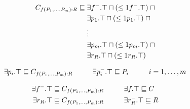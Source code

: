     \begin{equation} \label{e_op_tuple_rev}
      \begin{split}
  	C_{f(P_1, ..., P_m):R} \sqsubseteq \hspace*{1mm}& \exists f^-.\top \sqcap (\leq 1 f^-.\top) \hspace*{1mm} \sqcap \\
  	 \hspace*{1mm}& \exists p_1.\top \sqcap (\leq 1 p_1.\top) \hspace*{1mm} \sqcap \\
  	\hspace*{1mm}& \vdots  \\
  	\hspace*{1mm}& \exists p_m.\top \sqcap (\leq 1 p_m.\top) \hspace*{1mm} \sqcap \\
  	\hspace*{1mm}& \exists r_R.\top \sqcap (\leq 1 r_R.\top)\\
    \end{split}
    \end{equation}
    
    \begin{equation} \label{e_op_param_types_rev}
      \begin{split}  
  	\exists p_i.\top \sqsubseteq C_{f(P_1, ..., P_m):R}   \hspace*{1cm}  \exists p_i^-.\top \sqsubseteq P_i \hspace*{1cm} i = 1, \ldots, m \\
      \end{split}
    \end{equation}
    
    \begin{equation} \label{e_op_return_type_rev}
      \begin{split}
	\exists f^-.\top &\sqsubseteq C_{f(P_1, ..., P_m):R}   \hspace*{1cm}  \exists f.\top \sqsubseteq C \\
	\exists r_R.\top &\sqsubseteq C_{f(P_1, ..., P_m):R}   \hspace*{1cm}  \exists r_R^-.\top \sqsubseteq R\\
      \end{split}
    \end{equation}  
    
